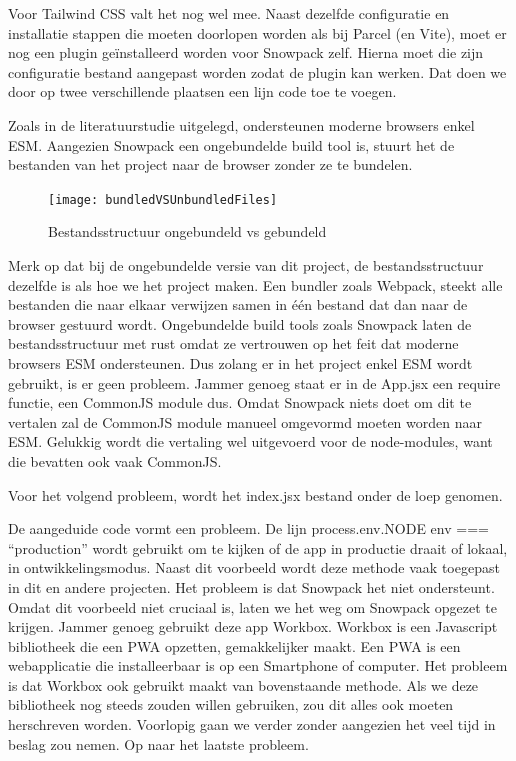 Voor Tailwind CSS valt het nog wel mee. Naast dezelfde configuratie en installatie stappen die moeten doorlopen worden als bij Parcel (en Vite), moet er nog een plugin geïnstalleerd worden voor Snowpack zelf. Hierna moet die zijn configuratie bestand aangepast worden zodat de plugin kan werken. Dat doen we door op twee verschillende plaatsen een lijn code toe te voegen.

Zoals in de literatuurstudie uitgelegd, ondersteunen moderne browsers enkel ESM. Aangezien Snowpack een ongebundelde build tool is, stuurt het de bestanden van het project naar de browser zonder ze te bundelen.

\begin{figure}[h]
   \texttt{[image: bundledVSUnbundledFiles]}
       \centering
       \caption{Bestandsstructuur ongebundeld vs gebundeld}
 \end{figure}

Merk op dat bij de ongebundelde versie van dit project, de bestandsstructuur dezelfde is als hoe we het project maken. Een bundler zoals Webpack, steekt alle bestanden die naar elkaar verwijzen samen in één bestand dat dan naar de browser gestuurd wordt. Ongebundelde build tools zoals Snowpack laten de bestandsstructuur met rust omdat ze vertrouwen op het feit dat moderne browsers ESM ondersteunen. Dus zolang er in het project enkel ESM wordt gebruikt, is er geen probleem. Jammer genoeg staat er in de App.jsx een require functie, een CommonJS module dus. Omdat Snowpack niets doet om dit te vertalen zal de CommonJS module manueel omgevormd moeten worden naar ESM. Gelukkig wordt die vertaling wel uitgevoerd voor de node-modules, want die bevatten ook vaak CommonJS.

Voor het volgend probleem, wordt het index.jsx bestand onder de loep genomen.



De aangeduide code vormt een probleem. De lijn process.env.NODE env === “production” wordt gebruikt om te kijken of de app in productie draait of lokaal, in ontwikkelingsmodus. Naast dit voorbeeld wordt deze methode vaak toegepast in dit en andere projecten. Het probleem is dat Snowpack het niet ondersteunt. Omdat dit voorbeeld niet cruciaal is, laten we het weg om Snowpack opgezet te krijgen. Jammer genoeg gebruikt deze app Workbox. Workbox is een Javascript bibliotheek die een PWA opzetten, gemakkelijker maakt. Een PWA is een webapplicatie die installeerbaar is op een Smartphone of computer. Het probleem is dat Workbox ook gebruikt maakt van bovenstaande methode. Als we deze bibliotheek nog steeds zouden willen gebruiken, zou dit alles ook moeten herschreven worden. Voorlopig gaan we verder zonder aangezien het veel tijd in beslag zou nemen. Op naar het laatste probleem.

